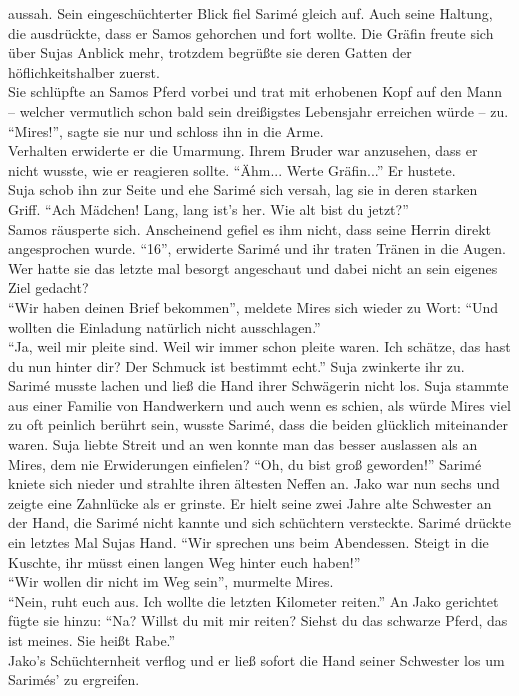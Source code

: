 aussah. Sein eingeschüchterter Blick fiel Sarimé gleich auf. Auch seine Haltung, die ausdrückte, 
dass er Samos gehorchen und fort wollte. Die Gräfin freute sich über Sujas Anblick mehr, trotzdem 
begrüßte sie deren Gatten der höflichkeitshalber zuerst. \\
Sie schlüpfte an Samos Pferd vorbei und trat mit erhobenen Kopf auf den Mann – welcher vermutlich 
schon bald sein dreißigstes Lebensjahr erreichen würde – zu. ``Mires!'', sagte sie nur und schloss 
ihn in die Arme. \\
Verhalten erwiderte er die Umarmung. Ihrem Bruder war anzusehen, dass er nicht wusste, wie er 
reagieren sollte. ``Ähm... Werte Gräfin...'' Er hustete.\\
Suja schob ihn zur Seite und ehe Sarimé sich versah, lag sie in deren starken Griff. 
``Ach Mädchen! Lang, lang ist's her. Wie alt bist du jetzt?''\\
Samos räusperte sich. Anscheinend gefiel es ihm nicht, dass seine Herrin direkt angesprochen wurde.
``16'', erwiderte Sarimé und ihr traten Tränen in die Augen. Wer hatte sie das letzte mal besorgt 
angeschaut und dabei nicht an sein eigenes Ziel gedacht? \\
``Wir haben deinen Brief bekommen'', meldete Mires sich wieder zu Wort: ``Und wollten die Einladung 
natürlich nicht ausschlagen.''\\
``Ja, weil mir pleite sind. Weil wir immer schon pleite waren. Ich schätze, das hast du nun hinter 
dir? Der Schmuck ist bestimmt echt.'' Suja zwinkerte ihr zu. \\
Sarimé musste lachen und ließ die Hand ihrer Schwägerin nicht los. Suja stammte aus einer Familie 
von Handwerkern und auch wenn es schien, als würde Mires viel zu oft peinlich berührt sein, wusste 
Sarimé, dass die beiden glücklich miteinander waren. Suja liebte Streit und an wen konnte man das 
besser auslassen als an Mires, dem nie Erwiderungen einfielen?
``Oh, du bist groß geworden!'' Sarimé kniete sich nieder und strahlte ihren ältesten Neffen an. 
Jako war nun sechs und zeigte eine Zahnlücke als er grinste. Er hielt seine zwei Jahre alte 
Schwester an der Hand, die Sarimé nicht kannte und sich schüchtern versteckte. Sarimé drückte ein 
letztes Mal Sujas Hand. ``Wir sprechen uns beim Abendessen. Steigt in die Kuschte, ihr müsst einen 
langen Weg hinter euch haben!''\\
``Wir wollen dir nicht im Weg sein'', murmelte Mires.\\
``Nein, ruht euch aus. Ich wollte die letzten Kilometer reiten.'' An Jako gerichtet fügte sie 
hinzu: ``Na? Willst du mit mir reiten? Siehst du das schwarze Pferd, das ist meines. Sie heißt 
Rabe.''\\
Jako's Schüchternheit verflog und er ließ sofort die Hand seiner Schwester los um Sarimés' zu 
ergreifen. \\


